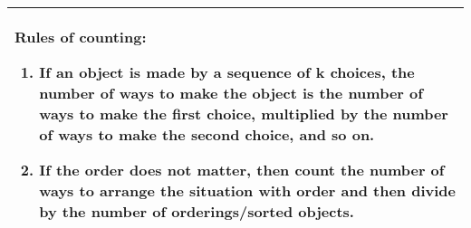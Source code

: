 {\tabulinesep=1mm
\begin{tabu}{|p{16cm} |}
\hline
\textbf{Rules of counting:}
\begin{enumerate}
\item
If an object is made by a sequence of k choices, the number of ways to make the object is the number of ways to make the first choice, multiplied by the number of ways to make the second choice, and so on.
\item
If the order does not matter, then count the number of ways to arrange the situation with order and then divide by the number of orderings/sorted objects.
\end{enumerate} \\
\hline
\end{tabu}
}